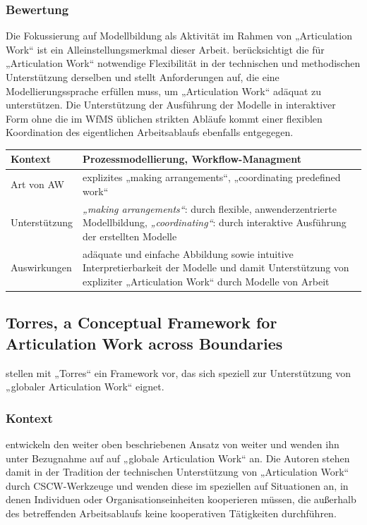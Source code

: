 \subsubsection{Bewertung}
Die Fokussierung auf Modellbildung als Aktivität im Rahmen von „Articulation Work“ ist ein Alleinstellungsmerkmal dieser Arbeit. \citeauthor{Jorgensen04} berücksichtigt die für „Articulation Work“ notwendige Flexibilität in der technischen und methodischen Unterstützung derselben und stellt Anforderungen auf, die eine Modellierungssprache erfüllen muss, um „Articulation Work“ adäquat zu unterstützen. Die Unterstützung der Ausführung der Modelle in interaktiver Form ohne die im \gls{WfMS} üblichen strikten Abläufe kommt einer flexiblen Koordination des eigentlichen Arbeitsablaufs ebenfalls entgegegen.
\\[1em]
\begin{tabular}{| p{3cm} | p{10cm} |}
  \hline
  Kontext & Prozessmodellierung, Workflow-Managment \\ \hline
  Art von AW & explizites „making arrangements“, „coordinating predefined work“ \\ \hline
  Unterstützung & \emph{„making arrangements“}: durch flexible, anwenderzentrierte Modellbildung, \emph{„coordinating“}: durch interaktive Ausführung der erstellten Modelle \\ \hline
  Auswirkungen & adäquate und einfache Abbildung sowie intuitive Interpretierbarkeit der Modelle und damit Unterstützung von expliziter „Articulation Work“ durch Modelle von Arbeit \\ \hline
\end{tabular}

\subsection{Torres, a Conceptual Framework for Articulation Work across Boundaries}

\citet{Cabitza06} stellen mit „Torres“ ein Framework vor, das sich speziell zur Unterstützung von „globaler Articulation Work“ eignet.

\subsubsection{Kontext}

\citet{Cabitza06} entwickeln den weiter oben beschriebenen Ansatz von \citet{Sarini02} weiter und wenden ihn unter Bezugnahme auf \citet{Faergemann05} auf „globale Articulation Work“ an. Die Autoren stehen damit in der Tradition der technischen Unterstützung von „Articulation Work“ durch \gls{CSCW}-Werkzeuge und wenden diese im speziellen auf Situationen an, in denen Individuen oder Organisationseinheiten kooperieren müssen, die außerhalb des betreffenden Arbeitsablaufs keine kooperativen Tätigkeiten durchführen.


